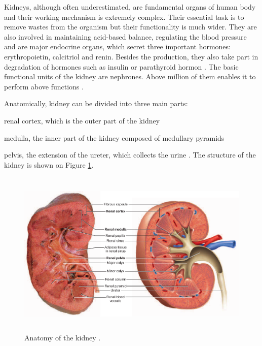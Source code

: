 Kidneys, although often underestimated, are fundamental organs of human body and their working mechanism is extremely complex. Their essential task is to remove wastes from the organism but their functionality is much wider. They are also involved in maintaining acid-based balance, regulating the blood pressure and are major endocrine organs, which secret three important hormones: erythropoietin, calcitriol and renin. Besides the production, they also take part in degradation of hormones such as insulin or parathyroid hormon \cite{saladin}.
The basic functional units of the kidney are nephrones. Above million of them enables it to perform above functions \cite{health_and_disease}.
  
Anatomically, kidney can be divided into three main parts:
\begin{inparaenum}[(1\upshape)]
\item renal cortex, which is the outer part of the kidney
\item medulla, the inner part of the kidney composed of medullary pyramids
\item pelvis, the extension of the ureter, which collects the urine \cite{saladin, health_and_disease}. The structure of the kidney is shown on Figure \ref{fig:kidney_anatomy}.
\end{inparaenum}

\begin{figure}
	\centering
	\includegraphics[height = 8cm]{img/kidney}
	\caption{Anatomy of the kidney \cite{saladin}.}
	\label{fig:kidney_anatomy}
\end{figure}


